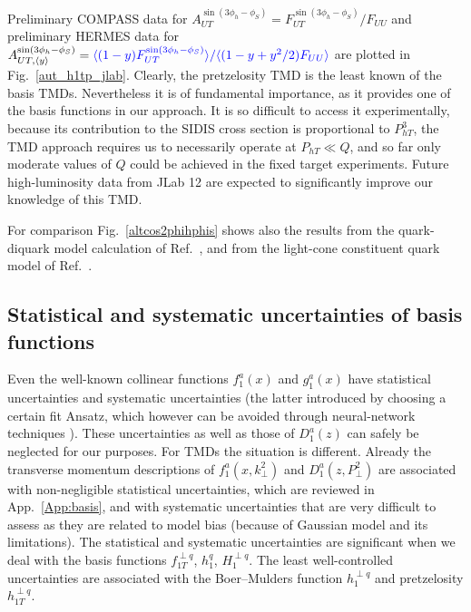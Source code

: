 \documentclass[a4paper,11pt]{article}
\newcommand{\blue}[1]{{\color{blue} #1}}
\newcommand{\la}{\langle}
\newcommand{\ra}{\rangle}
\newcommand{\ps}[1]{\blue{#1}}
\def\Phperp{P_{hT}}
\def\kperp{k_\perp}
\def\pperp{P_\perp}
\begin{document}
Preliminary COMPASS data \cite{Parsamyan:2013fia} for 
$A_{UT}^{\sin(3 \phi_h - \phi_S)}=F_{UT}^{\sin(3 \phi_h - \phi_S)}/F_{UU}$ and 
preliminary HERMES data \cite{Schnell:2010zza} for$
A_{UT, \langle y \rangle}^{\sin(3 \phi_h - \phi_S)}=\ps{\la
(1-y)F_{UT}^{\sin(3 \phi_h - \phi_S)}\ra/\la(1-y + y^2/2)F_{UU}\ra}$
are plotted in Fig.~\ref{aut_h1tp_jlab}. 
Clearly, the pretzelosity TMD is the least known of the basis TMDs.
Nevertheless it is of fundamental importance, as it provides one of the
basis functions in our approach. It is so difficult to access it
experimentally, because its contribution to the SIDIS cross section
is proportional to $\Phperp^3$, the TMD approach requires us to
necessarily operate at $\Phperp\ll Q$, and so far only moderate
values of $Q$ could be achieved in the fixed target experiments.
Future high-luminosity data from JLab 12 are expected
to significantly improve our knowledge of this TMD.

For comparison Fig.~\ref{altcos2phihphis} shows also the results
from the quark-diquark model calculation of Ref.~\cite{Kotzinian:2008fe},
and from the light-cone constituent quark model of Ref.~\cite{Boffi:2009sh}.



\subsection{Statistical and systematic uncertainties of basis functions}

Even the well-known collinear functions $f_1^a(x)$ and $g_1^a(x)$ have
statistical uncertainties and systematic uncertainties (the latter
introduced by choosing a certain fit Ansatz, which however can be
avoided through neural-network techniques \cite{Ball:2014uwa}).
These uncertainties as well as those of $D_1^a(z)$ can safely
be neglected for our purposes.
For TMDs the situation is different. Already the transverse
momentum descriptions of $f_1^a(x,\kperp^{2})$ and $D_1^a(z,\pperp^{2})$
are associated with non-negligible statistical uncertainties,
which are reviewed in App.~\ref{App:basis}, and with systematic
uncertainties that are very difficult to assess as they are
related to model bias (because of Gaussian model and its limitations).
The statistical and systematic uncertainties are significant
when we deal with the basis functions
$f_{1T}^{\perp q}$, $h_{1}^{q}$, $H_{1}^{\perp q}$.
The least well-controlled uncertainties are associated with the
Boer--Mulders function $h_1^{\perp q}$ and pretzelosity $h_{1T}^{\perp q}$.
\end{document}
